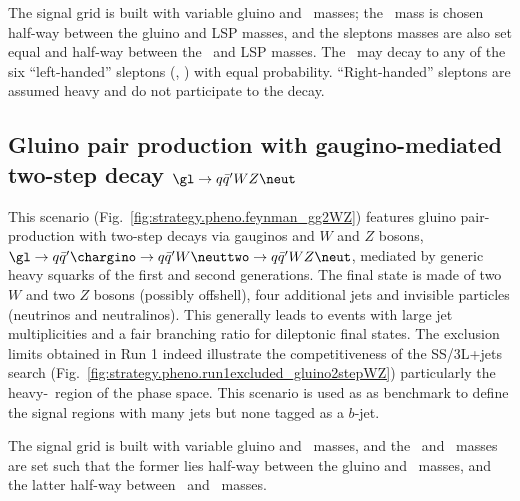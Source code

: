 The signal grid is built with variable gluino and \neut\ masses; the \neuttwo\ mass is chosen half-way between the gluino and LSP masses, 
and the sleptons masses are also set equal and half-way between the \neuttwo\ and LSP masses. 
The \neuttwo\ may decay to any of the six ``left-handed'' sleptons (\slep, \snu) with equal probability. 
``Right-handed'' sleptons are assumed heavy and do not participate to the decay. 


\subsection*{Gluino pair production with gaugino-mediated two-step decay $\gl\to q\bar q'WZ\neut$}
\label{subsec:signals_g2wz}

This scenario (Fig.~\ref{fig:strategy.pheno.feynman_gg2WZ}) features gluino pair-production with two-step decays via gauginos and $W$ and $Z$ bosons, 
$\gl\to q\bar{q}'\chargino\to q\bar{q}'W\neuttwo\to q\bar{q}'WZ\neut$, 
mediated by generic heavy squarks of the first and second generations. 
The final state is made of two $W$ and two $Z$ bosons (possibly offshell), 
four additional jets and invisible particles (neutrinos and neutralinos). 
This generally leads to events with large jet multiplicities and a fair branching ratio for dileptonic final states. 
The exclusion limits obtained in Run 1 indeed illustrate the competitiveness of the SS/3L+jets search (Fig.~\ref{fig:strategy.pheno.run1excluded_gluino2stepWZ})
particularly the heavy-\neut\ region of the phase space. 
This scenario is used as as benchmark to define the signal regions with many jets but none tagged as a $b$-jet. 

The signal grid is built with variable gluino and \neut\ masses, 
and the \chargino\ and \neuttwo\ masses are set such that the former lies half-way between the gluino and \neut\ masses, 
and the latter half-way between \chargino\ and \neut\ masses. 

